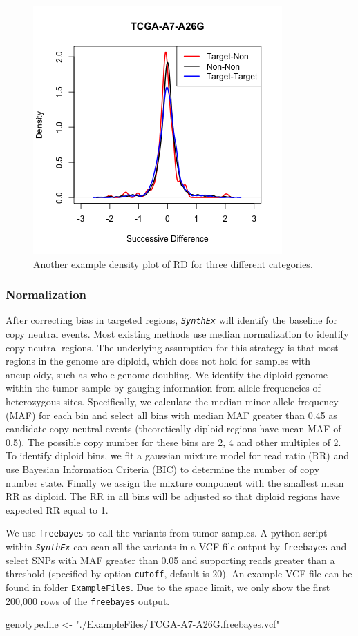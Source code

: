 \documentclass{article}
\newcommand{\pkg}[1]{\texttt{\textsl{#1}}}
\newcommand{\code}[1]{\texttt{#1}}
\begin{document}
\begin{figure}
\begin{center}
\includegraphics[width=.5\textwidth]{figure/fig2-1}
\end{center}
\caption{Another example density plot of RD for three different categories.}
\label{fig:2}
\end{figure}

\subsubsection{Normalization}

After correcting bias in targeted regions, \pkg{SynthEx} will identify the baseline for copy neutral events.
Most existing methods use median normalization to identify copy neutral regions. The underlying assumption for this strategy is that most regions in the genome are diploid, which does not hold for samples with aneuploidy, such as whole genome doubling. We identify the diploid genome within the tumor sample by gauging information from allele frequencies of heterozygous sites. Specifically, we calculate the median minor allele frequency (MAF) for each bin and select all bins with median MAF greater than 0.45 as candidate copy neutral events (theoretically diploid regions have mean MAF of 0.5). The possible copy number for these bins are 2, 4 and other multiples of 2. To identify diploid bins, we fit a gaussian mixture model for read ratio (RR) and use Bayesian Information Criteria (BIC) to determine the number of copy number state. Finally we assign the mixture component with the smallest mean RR as diploid. The RR in all bins will be adjusted so that diploid regions have expected RR equal to 1.

We use \code{freebayes} to call the variants from tumor samples. A python script within \pkg{SynthEx} can scan all the variants in a VCF file output by \code{freebayes} and select SNPs with MAF greater than 0.05 and supporting reads greater than a threshold (specified by option \code{cutoff}, default is 20). An example VCF file can be found in folder \code{ExampleFiles}. Due to the space limit, we only show the first 200,000 rows of the \code{freebayes} output.
\begin{Schunk}
\begin{Sinput}
 genotype.file <- "./ExampleFiles/TCGA-A7-A26G.freebayes.vcf"
\end{Sinput}
\end{Schunk}
\end{document}
